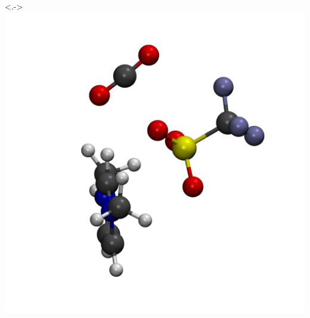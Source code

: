 \documentclass{beamer}
\begin{document}
\begin{frame}
\begin{columns}
    \uncover<.->{\includegraphics[scale=0.09]{./figures/cluster_TfO.png}}
  \end{columns}
\end{frame}

\end{document}
